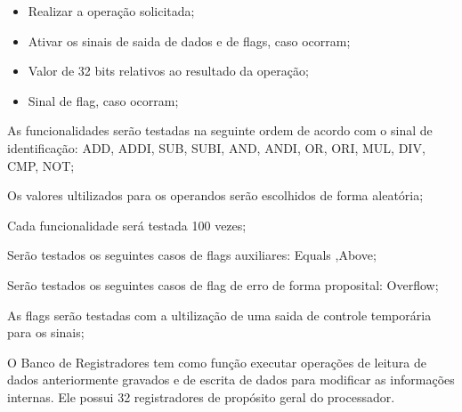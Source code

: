 \documentclass{article}
\begin{document}
  \actions
  \begin{itemize}
     \item Realizar a operação solicitada;
     \item Ativar os sinais de saida de dados e de flags, caso ocorram;
    \end{itemize}
  
  \results
  	\begin{itemize}
     \item Valor de 32 bits relativos ao resultado da operação;
     \item Sinal de flag, caso ocorram;
    \end{itemize}
  
  \begin{mainflow}
    \item As funcionalidades serão testadas na seguinte ordem de acordo com o sinal de identificação: ADD, ADDI, SUB, SUBI,
AND, ANDI, OR, ORI, MUL, DIV, CMP, NOT;
    \item Os valores ultilizados para os operandos serão escolhidos de forma aleatória;
    \item Cada funcionalidade será testada 100 vezes;
    \item Serão testados os seguintes casos de flags auxiliares: Equals ,Above;
    \item Serão testados os seguintes casos de flag de erro de forma proposital: Overflow;
    \item As flags serão testadas com a ultilização de uma saida de controle temporária para os sinais;
  \end{mainflow}
  
  
O Banco de Registradores tem como função executar operações de 
leitura de dados anteriormente gravados e de escrita de dados para modificar as informações internas. Ele possui 32 registradores de propósito geral do processador. 
  
\end{document}
